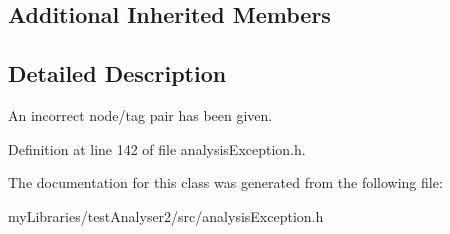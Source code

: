 \subsection*{Additional Inherited Members}


\subsection{Detailed Description}
An incorrect node/tag pair has been given. 

Definition at line 142 of file analysis\+Exception.\+h.



The documentation for this class was generated from the following file\+:\begin{DoxyCompactItemize}
\item 
my\+Libraries/test\+Analyser2/src/analysis\+Exception.\+h\end{DoxyCompactItemize}
